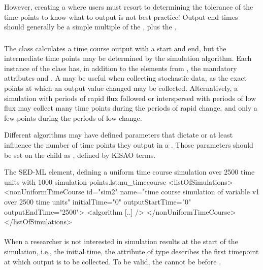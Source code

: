 \begin{blockChanged}
\begin{itemize}
    However, creating a \UniformTimeCourse where users must resort to determining the tolerance of the time points to know what to output is not best practice!  Output end times should generally be a simple multiple of the , plus the .
\end{itemize}
\end{blockChanged}

\begin{blockChanged}
\subsubsection{}
\label{class:nonUniformTimeCourse}
The \NonUniformTimeCourse class calculates a time course output with a start and end, but the intermediate time points may be determined by the simulation algorithm. Each instance of the \NonUniformTimeCourse class has, in addition to the elements from \TimeCourse, the mandatory attributes \hyperref[sec:nu_outputStartTime]{} and \hyperref[sec:nu_outputEndTime]{}. A \NonUniformTimeCourse may be useful when collecting stochastic data, as the exact points at which an output value changed may be collected.  Alternatively, a simulation with periods of rapid flux followed or interspersed with periods of low flux may collect many time points during the periods of rapid change, and only a few points during the periods of low change.

Different algorithms may have defined parameters that dictate or at least influence the number of time points they output in a \NonUniformTimeCourse.  Those parameters should be set on the child \Algorithm as \AlgorithmParameters, defined by KiSAO terms. 

\begin{myXmlLst}{The SED-ML  element, defining a uniform time course simulation over 2500 time units with 1000 simulation points.}{lst:nu_timecourse}
<listOfSimulations>
	<nonUniformTimeCourse id="sim2"  name="time course simulation of variable v1 over 2500 time units"  
		initialTime="0" outputStartTime="0" outputEndTime="2500">
		<algorithm [..] />
 	</nonUniformTimeCourse>
</listOfSimulations>
\end{myXmlLst}

\paragraph*{}
\label{sec:nu_outputStartTime}
When a researcher is not interested in simulation results at the start of the simulation, i.e., the initial time, the attribute  of type  describes the first timepoint at which output is to be collected. To be valid, the  cannot be before \hyperref[sec:initialTime]{}.


\end{blockChanged}
